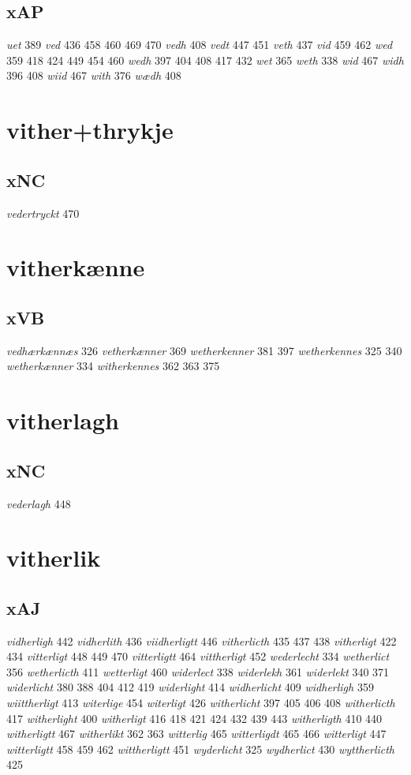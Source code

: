 \documentclass[a4paper,twocolumn]{article}
\begin{document}
\subsection{xAP}
\label{sec:org4e19a87}
\emph{uet} 389 \emph{ved} 436 458 460 469 470 \emph{vedh} 408 \emph{vedt} 447 451 \emph{veth} 437 \emph{vid} 459 462 \emph{wed} 359 418 424 449 454 460 \emph{wedh} 397 404 408 417 432 \emph{wet} 365 \emph{weth} 338 \emph{wid} 467 \emph{widh} 396 408 \emph{wiid} 467 \emph{with} 376 \emph{wædh} 408 
\section{vither+thrykje}
\label{sec:orgffb237c}
\subsection{xNC}
\label{sec:orge4c159d}
\emph{vedertryckt} 470 
\section{vitherkænne}
\label{sec:org989fac1}
\subsection{xVB}
\label{sec:org3301f9f}
\emph{vedhærkænnæs} 326 \emph{vetherkænner} 369 \emph{wetherkenner} 381 397 \emph{wetherkennes} 325 340 \emph{wetherkænner} 334 \emph{witherkennes} 362 363 375 
\section{vitherlagh}
\label{sec:org01ad2d8}
\subsection{xNC}
\label{sec:orgfed232c}
\emph{vederlagh} 448 
\section{vitherlik}
\label{sec:org7b6f69e}
\subsection{xAJ}
\label{sec:org52696ae}
\emph{vidherligh} 442 \emph{vidherlith} 436 \emph{viidherligtt} 446 \emph{vitherlicth} 435 437 438 \emph{vitherligt} 422 434 \emph{vitterligt} 448 449 470 \emph{vitterligtt} 464 \emph{vittherligt} 452 \emph{wederlecht} 334 \emph{wetherlict} 356 \emph{wetherlicth} 411 \emph{wetterligt} 460 \emph{widerlect} 338 \emph{widerlekh} 361 \emph{widerlekt} 340 371 \emph{widerlicht} 380 388 404 412 419 \emph{widerlight} 414 \emph{widherlicht} 409 \emph{widherligh} 359 \emph{wiittherligt} 413 \emph{witerlige} 454 \emph{witerligt} 426 \emph{witherlicht} 397 405 406 408 \emph{witherlicth} 417 \emph{witherlight} 400 \emph{witherligt} 416 418 421 424 432 439 443 \emph{witherligth} 410 440 \emph{witherligtt} 467 \emph{witherlikt} 362 363 \emph{witterlig} 465 \emph{witterligdt} 465 466 \emph{witterligt} 447 \emph{witterligtt} 458 459 462 \emph{wittherligtt} 451 \emph{wyderlicht} 325 \emph{wydherlict} 430 \emph{wyttherlicth} 425 
\end{document}
